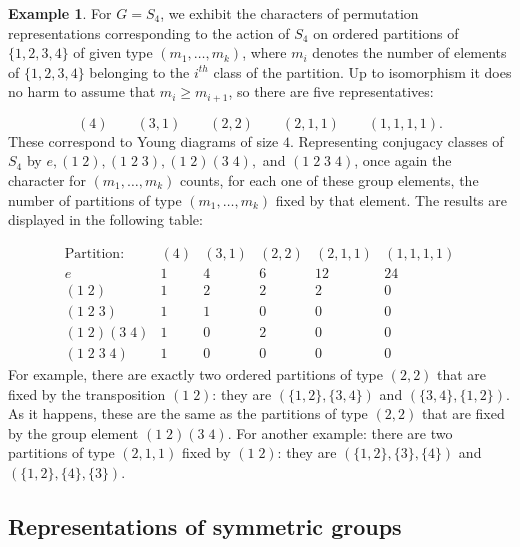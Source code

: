 \documentclass[12pt,titlepage]{article}
\newcommand{\itexarray}[1]{\begin{matrix}#1\end{matrix}}
\theoremstyle{plain}
\theoremstyle{definition}
\newtheorem{example}{Example}
\theoremstyle{remark}
\begin{document}
\begin{example}
\label{}\hypertarget{}{}
For $G = S_4$, we exhibit the characters of permutation representations corresponding to the action of $S_4$ on ordered partitions of $\{1, 2, 3, 4\}$ of given type $(m_1, \ldots, m_k)$, where $m_i$ denotes the number of elements of $\{1, 2, 3, 4\}$ belonging to the $i^{th}$ class of the partition. Up to isomorphism it does no harm to assume that $m_i \geq m_{i+1}$, so there are five representatives:

\begin{displaymath}
(4) \qquad (3, 1) \qquad (2, 2) \qquad (2, 1, 1) \qquad (1, 1, 1, 1).
\end{displaymath}
These correspond to Young diagrams of size $4$. Representing conjugacy classes of $S_4$ by $e, (1\; 2), (1\; 2\; 3), (1\; 2)(3\; 4),$ and $(1\; 2\; 3\; 4)$, once again the character for $(m_1,\ldots, m_k)$ counts, for each one of these group elements, the number of partitions of type $(m_1, \ldots, m_k)$ fixed by that element. The results are displayed in the following table:

\begin{displaymath}
\itexarray{
\text{Partition:} & (4) & (3, 1) & (2, 2) & (2, 1, 1) & (1, 1, 1, 1) \\ 
e & 1 & 4 & 6 & 12 & 24 \\ 
(1\; 2) & 1 & 2 & 2 & 2 & 0 \\ 
(1\; 2\; 3) & 1 & 1 & 0 & 0 & 0 \\ 
(1\; 2)(3\; 4) & 1 & 0 & 2 & 0 & 0 \\ 
(1\; 2\; 3\; 4) & 1 & 0 & 0 & 0 & 0
}
\end{displaymath}
For example, there are exactly two ordered partitions of type $(2, 2)$ that are fixed by the transposition $(1\; 2)$: they are $(\{1, 2\}, \{3, 4\})$ and $(\{3, 4\}, \{1, 2\})$. As it happens, these are the same as the partitions of type $(2, 2)$ that are fixed by the group element $(1\; 2)(3\; 4)$. For another example: there are two partitions of type $(2, 1, 1)$ fixed by $(1\; 2)$: they are $(\{1, 2\}, \{3\}, \{4\})$ and $(\{1, 2\}, \{4\}, \{3\})$.

\end{example}
\hypertarget{representations_of_symmetric_groups}{}\subsection*{{Representations of symmetric groups}}\label{representations_of_symmetric_groups}
\end{document}
